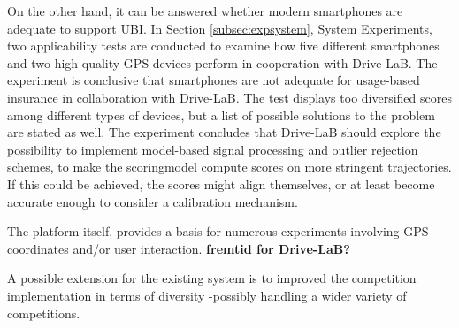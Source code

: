 On the other hand, it can be answered whether modern smartphones are adequate to support UBI. In Section \ref{subsec:expsystem}, System Experiments, two applicability tests are conducted to examine how five different smartphones and two high quality GPS devices perform in cooperation with Drive-LaB. The experiment is conclusive that smartphones are not adequate for usage-based insurance in collaboration with Drive-LaB. The test displays too diversified scores among different types of devices, but a list of possible solutions to the problem are stated as well. The experiment concludes that Drive-LaB should explore the possibility to implement model-based signal processing and outlier rejection schemes, to make the scoringmodel compute scores on more stringent trajectories. If this could be achieved, the scores might align themselves, or at least become accurate enough to consider a calibration mechanism.

The platform itself, provides a basis for numerous experiments involving GPS coordinates and/or user interaction. \textbf{fremtid for Drive-LaB?}

A possible extension for the existing system is to improved the competition implementation in terms of diversity -possibly handling a wider variety of competitions.


\addtolength{\textheight}{-12cm}   %
